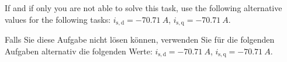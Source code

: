 \begin{hintblock}
	If and if only you are not able to solve this task, use the following alternative values for the following tasks: $i_{\mathrm{s,d}}=\SI{-70.71}{A}$, $i_{\mathrm{s,q}}=\SI{-70.71}{A}$.
\end{hintblock}


\begin{germanhintblock}
	Falls Sie diese Aufgabe nicht lösen können, verwenden Sie für die folgenden Aufgaben alternativ die folgenden Werte: $i_{\mathrm{s,d}}=\SI{-70.71}{A}$, $i_{\mathrm{s,q}}=\SI{-70.71}{A}$.
\end{germanhintblock}

